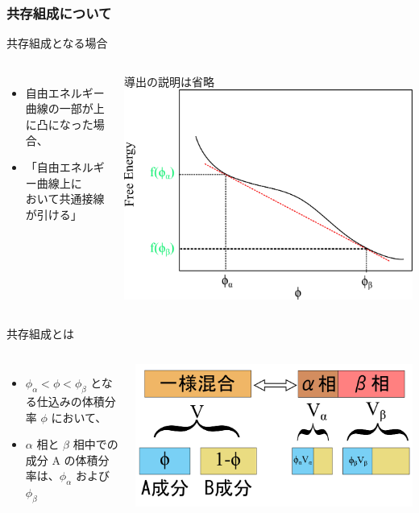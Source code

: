 \documentclass[12pt, dvipdfmx]{beamer}
\begin{document}
\begin{frame}
	\frametitle{共存組成について}
		\begin{block}{共存組成となる場合}
			\begin{columns}[c, onlytextwidth]
					\begin{itemize}
						\item 自由エネルギー曲線の一部が上に凸になった場合、
						\item 「自由エネルギー曲線上に\\おいて共通接線が引ける」
					\end{itemize}
					\alert{導出の説明は省略}
						\centering
							\includegraphics[width=.9\textwidth]{freeEform_4.png}
			\end{columns}
		\end{block}
 
		\begin{alertblock}{共存組成とは}
			\begin{columns}[c, onlytextwidth]
				\begin{itemize}
					\item $\phi_\alpha < \phi  < \phi_\beta$ となる仕込みの体積分率 $\phi$ において、 
					\item $\alpha$ 相と $\beta$ 相中での成分 A の体積分率は、$\phi_\alpha$ および $\phi_\beta$
				\end{itemize}
				\centering
				\includegraphics[width=\textwidth]{freeEform_1.png}
			\end{columns}
		\end{alertblock}
\end{frame}
\end{document}
